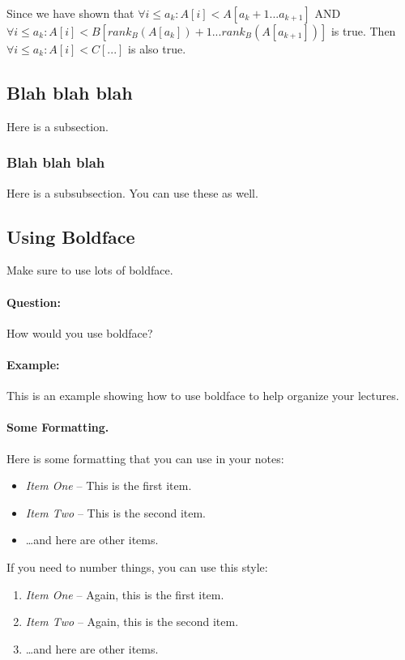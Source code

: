 \documentclass[11pt]{article}
\begin{document}
Since we have shown that $\forall i \leq a_k : A[i] < A[a_k+1 ... a_{k+1}]$ AND $\forall i \leq a_k : A[i] < B[rank_B(A[a_k])+1 ... rank_B(A[a_{k+1}])]$ is true. Then $\forall i \leq a_k : A[i] < C[...]$ is also true.

\subsection{Blah blah blah}
Here is a subsection.

\subsubsection{Blah blah blah}
Here is a subsubsection. You can use these as well.

\subsection{Using Boldface}
Make sure to use lots of boldface.

\paragraph{Question:}
How would you use boldface?

\paragraph{Example:}
This is an example showing how to use boldface to
help organize your lectures.


\paragraph{Some Formatting.}
Here is some formatting that you can use in your notes:
\begin{itemize}
\item {\em Item One} -- This is the first item.
\item {\em Item Two} -- This is the second item.
\item \dots and here are other items.
\end{itemize}

If you need to number things, you can use this style:
\begin{enumerate}
\item {\em Item One} -- Again, this is the first item.
\item {\em Item Two} -- Again, this is the second item.
\item \dots and here are other items.
\end{enumerate}

%

\end{document}
